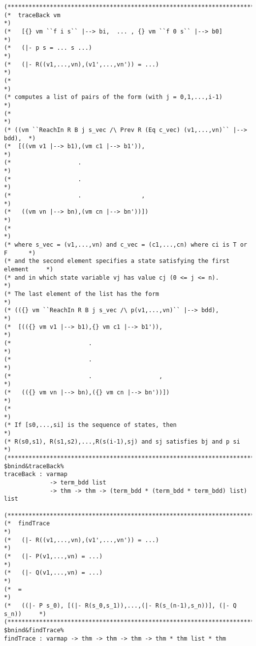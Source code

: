 \documentclass[12pt]{article}
\begin{document}
\begin{footnotesize}
\begin{Verbatim}[commandchars=\$\&\%]
(*****************************************************************************)
(*  traceBack vm                                                             *)
(*   [{} vm ``f i s`` |--> bi,  ... , {} vm ``f 0 s`` |--> b0]               *)
(*   (|- p s = ... s ...)                                                    *)
(*   (|- R((v1,...,vn),(v1',...,vn')) = ...)                                 *)
(*                                                                           *)
(* computes a list of pairs of the form (with j = 0,1,...,i-1)               *)
(*                                                                           *)
(* ((vm ``ReachIn R B j s_vec /\ Prev R (Eq c_vec) (v1,...,vn)`` |--> bdd),  *)
(*  [((vm v1 |--> b1),(vm c1 |--> b1')),                                     *)
(*                   .                                                       *)
(*                   .                                                       *)
(*                   .                 ,                                     *)
(*   ((vm vn |--> bn),(vm cn |--> bn'))])                                    *)
(*                                                                           *)
(* where s_vec = (v1,...,vn) and c_vec = (c1,...,cn) where ci is T or F      *)
(* and the second element specifies a state satisfying the first element     *)
(* and in which state variable vj has value cj (0 <= j <= n).                *)
(* The last element of the list has the form                                 *)
(* (({} vm ``ReachIn R B j s_vec /\ p(v1,...,vn)`` |--> bdd),                *)
(*  [(({} vm v1 |--> b1),{} vm c1 |--> b1')),                                *)
(*                      .                                                    *)
(*                      .                                                    *)
(*                      .                   ,                                *)
(*   (({} vm vn |--> bn),({} vm cn |--> bn'))])                              *)
(*                                                                           *)
(* If [s0,...,si] is the sequence of states, then                            *)
(* R(s0,s1), R(s1,s2),...,R(s(i-1),sj) and sj satisfies bj and p si          *)
(*****************************************************************************)
$bnind&traceBack%
traceBack : varmap 
             -> term_bdd list 
             -> thm -> thm -> (term_bdd * (term_bdd * term_bdd) list) list

(*****************************************************************************)
(*  findTrace                                                                *)
(*   (|- R((v1,...,vn),(v1',...,vn')) = ...)                                 *)
(*   (|- P(v1,...,vn) = ...)                                                 *)
(*   (|- Q(v1,...,vn) = ...)                                                 *)
(*  =                                                                        *)
(*   ((|- P s_0), [(|- R(s_0,s_1)),...,(|- R(s_(n-1),s_n))], (|- Q s_n))     *)
(*****************************************************************************)
$bnind&findTrace%
findTrace : varmap -> thm -> thm -> thm -> thm * thm list * thm


\end{Verbatim}
\end{footnotesize}
\end{document}
